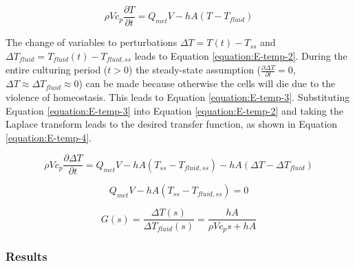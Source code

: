 \vspace{-5mm}
\begin{equation}
    \rho V c_p \frac{\partial T}{\partial t} = Q_{met} V - hA(T-T_{fluid})
\end{equation}

The change of variables to perturbations $\Delta T = T(t) - T_{ss}$ and $\Delta T_{fluid} = T_{fluid}(t) - T_{fluid, ss}$ leads to Equation \ref{equation:E-temp-2}. During the entire culturing period ($t>0$) the steady-state assumption ($\frac{\partial \Delta T}{\partial t} = 0$, $\Delta T \approx \Delta T_{fluid} \approx 0$) can be made because otherwise the cells will die due to the violence of homeostasis. This leads to Equation \ref{equation:E-temp-3}. Substituting Equation \ref{equation:E-temp-3} into Equation \ref{equation:E-temp-2} and taking the Laplace transform leads to the desired transfer function, as shown in Equation \ref{equation:E-temp-4}.

\vspace{-5mm}
\begin{equation}
    \rho V c_p \frac{\partial \Delta T}{\partial t} = Q_{met} V - hA(T_{ss} - T_{fluid, ss}) - hA(\Delta T - \Delta T_{fluid})
    \label{equation:E-temp-2}
\end{equation}

\vspace{-10mm}
\begin{equation}
    Q_{met} V - hA(T_{ss} - T_{fluid, ss}) = 0
    \label{equation:E-temp-3}
\end{equation}

\vspace{-10mm}
\begin{equation}
    G(s) = \frac{\Delta T(s)}{\Delta T_{fluid}(s)} = \frac{hA}{\rho V c_p s + hA}
    \label{equation:E-temp-4}
\end{equation}

\subsubsection{Results}




